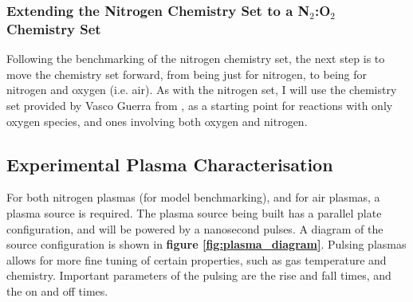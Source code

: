 \documentclass[11pt, oneside]{article}   	%
\begin{document}



\subsubsection{Extending the Nitrogen Chemistry Set to a N$_2$:O$_2$ Chemistry Set}

Following the benchmarking of the nitrogen chemistry set, the next step is to move the chemistry set forward, from being just for nitrogen, to being for nitrogen and oxygen (i.e. air).
As with the nitrogen set, I will use the chemistry set provided by Vasco Guerra from \cite{Kutasi2016tuning}, as a starting point for reactions with only oxygen species, and ones involving both oxygen and nitrogen.

\subsection{Experimental Plasma Characterisation}
\label{subsec:exp_characterisation}

For both nitrogen plasmas (for model benchmarking), and for air plasmas, a plasma source is required.
The plasma source being built has a parallel plate configuration, and will be powered by a nanosecond pulses.
A diagram of the source configuration is shown in \textbf{figure \ref{fig:plasma_diagram}}.
Pulsing plasmas allows for more fine tuning of certain properties, such as gas temperature and chemistry.
Important parameters of the pulsing are the rise and fall times, and the on and off times.

\end{document}
